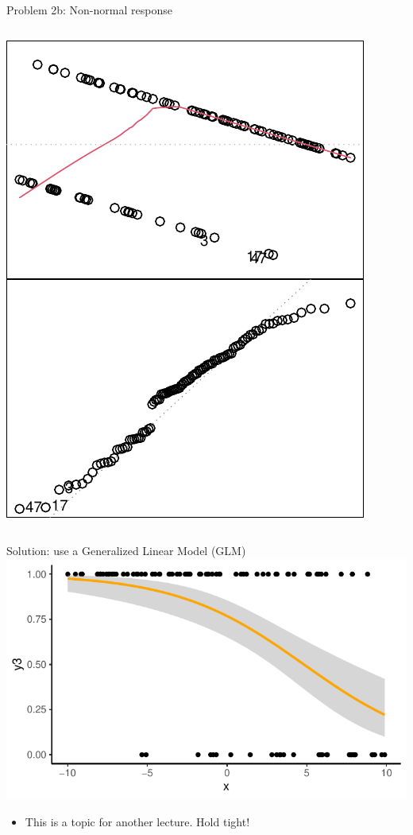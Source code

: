 \documentclass[
  ignorenonframetext,
  aspectratio=169]{beamer}
\providecommand{\tightlist}{%
  \setlength{\itemsep}{0pt}\setlength{\parskip}{0pt}}
\begin{document}
\begin{frame}[fragile]{Problem 2b: Non-normal response}
\begin{columns}[T]
\begin{column}{0.48\textwidth}
\includegraphics{03-Lecture_files/figure-beamer/unnamed-chunk-41-1.pdf}
\end{column}
\end{columns}
\end{frame}

\begin{frame}{Solution: use a Generalized Linear Model (GLM)}
\protect\hypertarget{solution-use-a-generalized-linear-model-glm}{}
\includegraphics{03-Lecture_files/figure-beamer/unnamed-chunk-42-1.pdf}

\begin{itemize}[<+->]
\tightlist
\item
  This is a topic for another lecture. Hold tight!
\end{itemize}
\end{frame}
\end{document}
